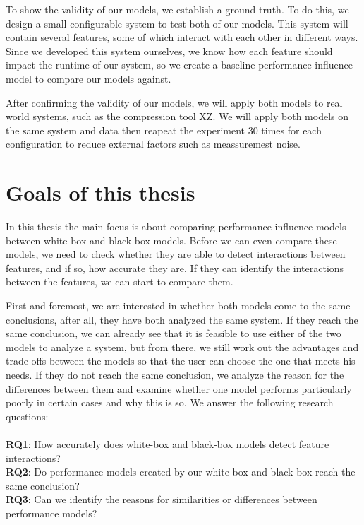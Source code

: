 To show the validity of our models, we establish a ground truth. To do this, we design a small configurable system to test both of our 
models. This system will contain several features, some of which interact with each other in different ways. 
Since we developed this system ourselves, we know how each feature should impact the runtime of our system, so we create
a baseline performance-influence model to compare our models against.

After confirming the validity of our models, we will apply both models to real world systems, such as the compression tool
XZ. We will apply both models on the same system and data then reapeat the experiment 30 times for each configuration to reduce external
factors such as meassuremest noise.

\section{Goals of this thesis}
In this thesis the main focus is about comparing performance-influence models between white-box and black-box models. 
Before we can even compare these models, we need to check whether they are able to detect interactions between features, 
and if so, how accurate they are. If they can identify the interactions between the features, we can start to compare them. 

First and foremost, we are interested in whether both models come to the same conclusions, after all, they have both analyzed the same system. 
If they reach the same conclusion, we can already see that it is feasible to use either of the two models to analyze a system, 
but from there, we still work out the advantages and trade-offs between the models so that the user can choose the one that meets 
his needs. If they do not reach the same conclusion, we analyze the reason for the differences between them and examine whether one model 
performs particularly poorly in certain cases and why this is so. We answer the following research questions:\\\\

\noindent \textbf{RQ1}: How accurately does white-box and black-box models detect feature interactions? \\
\noindent \textbf{RQ2}: Do performance models created by our white-box and black-box reach the same conclusion?\\
\noindent \textbf{RQ3}: Can we identify the reasons for similarities or differences between performance models?\\
